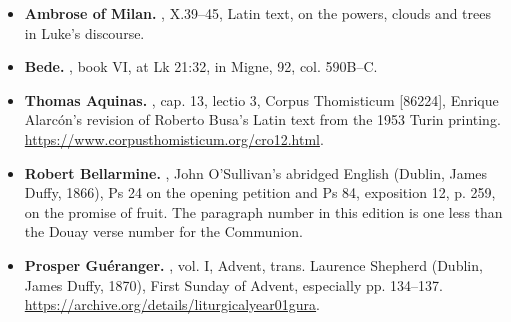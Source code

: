 \begin{itemize}
\item \textbf{Ambrose of Milan.} , X.39--45, Latin text, on the powers, clouds and trees in Luke's discourse.
\item \textbf{Bede.} , book VI, at Lk 21:32, in Migne,  92, col. 590B--C.
\item \textbf{Thomas Aquinas.} , cap. 13, lectio 3, Corpus Thomisticum [86224], Enrique Alarcón's revision of Roberto Busa's Latin text from the 1953 Turin printing. \url{https://www.corpusthomisticum.org/cro12.html}.
\item \textbf{Robert Bellarmine.} , John O'Sullivan's abridged English (Dublin, James Duffy, 1866), Ps 24 on the opening petition and Ps 84, exposition 12, p. 259, on the promise of fruit. The paragraph number in this edition is one less than the Douay verse number for the Communion.
\item \textbf{Prosper Guéranger.} , vol. I, Advent, trans. Laurence Shepherd (Dublin, James Duffy, 1870), First Sunday of Advent, especially pp. 134--137. \url{https://archive.org/details/liturgicalyear01gura}.
\end{itemize}
